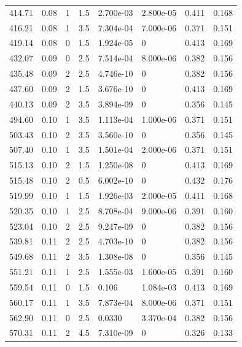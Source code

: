 \documentclass[preview]{standalone}
\begin{document}
{{{\begin{tabular}{L{1.2cm}C{1.2cm} C{0.3cm}C{0.5cm} C{1.4cm}C{1.4cm} C{1.4cm}C{1.4cm}}
  414.71  &  0.08  & 1     & 1.5 &  2.700e-03  & 2.800e-05  & 0.411 &  0.168   \\ 
  416.21  &  0.08  & 1     & 3.5 &  7.304e-04  & 7.000e-06  & 0.371 &  0.151   \\ 
  419.14  &  0.08  & 0     & 1.5 &  1.924e-05  & 0  & 0.413 &  0.169   \\ 
  432.07  &  0.09  & 0     & 2.5 &  7.514e-04  & 8.000e-06  & 0.382 &  0.156   \\ 
  435.48  &  0.09  & 2     & 2.5 &  4.746e-10  & 0  & 0.382 &  0.156   \\ 
  437.60  &  0.09  & 2     & 1.5 &  3.676e-10  & 0  & 0.413 &  0.169   \\ 
  440.13  &  0.09  & 2     & 3.5 &  3.894e-09  & 0  & 0.356 &  0.145   \\ 
  494.60  &  0.10  & 1     & 3.5 &  1.113e-04  & 1.000e-06  & 0.371 &  0.151   \\ 
  503.43  &  0.10  & 2     & 3.5 &  3.560e-10  & 0  & 0.356 &  0.145   \\ 
  507.40  &  0.10  & 1     & 3.5 &  1.501e-04  & 2.000e-06  & 0.371 &  0.151   \\ 
  515.13  &  0.10  & 2     & 1.5 &  1.250e-08  & 0  & 0.413 &  0.169   \\ 
  515.48  &  0.10  & 2     & 0.5 &  6.002e-10  & 0  & 0.432 &  0.176   \\ 
  519.99  &  0.10  & 1     & 1.5 &  1.926e-03  & 2.000e-05  & 0.411 &  0.168   \\ 
  520.35  &  0.10  & 1     & 2.5 &  8.708e-04  & 9.000e-06  & 0.391 &  0.160   \\ 
  523.04  &  0.10  & 2     & 2.5 &  9.247e-09  & 0  & 0.382 &  0.156   \\ 
  539.81  &  0.11  & 2     & 2.5 &  4.703e-10  & 0  & 0.382 &  0.156   \\ 
  549.68  &  0.11  & 2     & 3.5 &  1.308e-08  & 0  & 0.356 &  0.145   \\ 
  551.21  &  0.11  & 1     & 2.5 &  1.555e-03  & 1.600e-05  & 0.391 &  0.160   \\ 
  559.54  &  0.11  & 0     & 1.5 &  0.106  & 1.084e-03  & 0.413 &  0.169   \\ 
  560.17  &  0.11  & 1     & 3.5 &  7.873e-04  & 8.000e-06  & 0.371 &  0.151   \\ 
  562.90  &  0.11  & 0     & 2.5 &  0.0330  & 3.370e-04  & 0.382 &  0.156   \\ 
  570.31  &  0.11  & 2     & 4.5 &  7.310e-09  & 0  & 0.326 &  0.133   \\ 

\end{tabular}}}}
\end{document}
